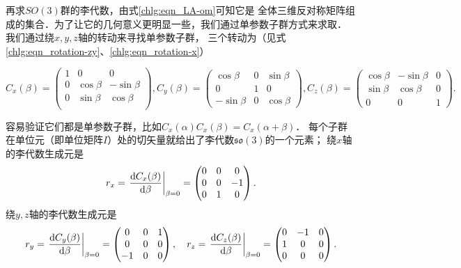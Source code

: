 再求$SO(3)$群的李代数，由式\eqref{chlg:eqn_LA-om}可知它是
全体三维反对称矩阵组成的集合．为了让它的几何意义更明显一些，我们通过单参数子群方式来求取．
我们通过绕$x,y,z$轴的转动来寻找单参数子群，
三个转动为（见式\eqref{chlg:eqn_rotation-zy}、\eqref{chlg:eqn_rotation-x}）
\begin{small}  %
\begin{equation*}
    {C_x}( \beta  ) = \begin{pmatrix}
        1&0&0 \\
        0&{\cos \beta }&{ - \sin \beta } \\
        0&{\sin \beta }&{\cos \beta } \\
    \end{pmatrix}, 
{C_y}( \beta ) = \begin{pmatrix}
    {\cos \beta }&0&{  \sin \beta }  \\
    0&1&0\\
    { - \sin \beta } &0&{\cos \beta }
\end{pmatrix} ,
    {C_z}( \beta  ) =  \begin{pmatrix}
    {\cos \beta }&{ - \sin \beta }&0 \\
    {\sin \beta }&{\cos \beta }&0 \\
    0&0&1
\end{pmatrix} .
\end{equation*} %
\end{small}
容易验证它们都是单参数子群，比如$C_x(\alpha)C_x(\beta)=C_x(\alpha+\beta)$．
每个子群在单位元（即单位矩阵$I$）处的切矢量就给出了李代数$\mathfrak{so}(3)$的一个元素；
绕$x$轴的李代数生成元是
\begin{equation}
    r_x=\left.\frac{{\rm d}C_x(\beta)}{{\rm d}\beta}\right|_{\beta=0}
    =\begin{pmatrix}
        0 & 0 & 0 \\
        0& 0 & -1 \\
        0 & 1 & 0
    \end{pmatrix}.
\end{equation}
绕$y,z$轴的李代数生成元是
\begin{equation*}
    r_y=\left.\frac{{\rm d}C_y(\beta)}{{\rm d}\beta}\right|_{\beta=0}
    =\begin{pmatrix}
        0 & 0 & 1 \\
        0 & 0 & 0 \\
        -1 & 0 & 0
    \end{pmatrix},\quad
    r_z=\left.\frac{{\rm d}C_z(\beta)}{{\rm d}\beta}\right|_{\beta=0}
    =\begin{pmatrix}
        0 & - 1 & 0 \\
        1& 0 & 0 \\
        0 & 0 & 0
    \end{pmatrix} .
\end{equation*}
